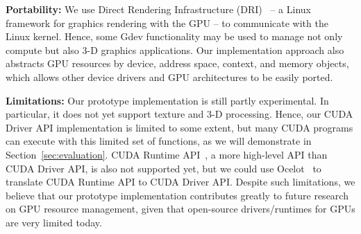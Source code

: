 \textbf{Portability:}
We use Direct Rendering Infrastructure (DRI)~\cite{DRI} -- a Linux
framework for graphics rendering with the GPU -- to communicate with the
Linux kernel.
Hence, some Gdev functionality may be used to manage not only compute
but also 3-D graphics applications.
Our implementation approach also abstracts GPU resources by device,
address space, context, and memory objects, which allows other device
drivers and GPU architectures to be easily ported.

\textbf{Limitations:}
Our prototype implementation is still partly experimental.
In particular, it does not yet support texture and 3-D processing.
Hence, our CUDA Driver API implementation is limited to some extent, but
many CUDA programs can execute with this limited set of functions, as we
will demonstrate in Section~\ref{sec:evaluation}.
CUDA Runtime API~\cite{CUDA40}, a more high-level API than CUDA Driver
API, is also not supported yet, but we could use
Ocelot~\cite{Diamos_PACT10} to translate CUDA Runtime API to CUDA Driver
API.
Despite such limitations, we believe that our prototype implementation
contributes greatly to future research on GPU resource management,
given that open-source drivers/runtimes for GPUs are very limited today.


